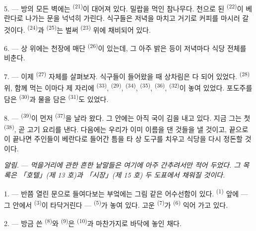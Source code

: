 \VUsaut{4.6mm}
\VUsaut{3.0mm}

5. --- 방의 모든 벽에는  \textsuperscript{(21)}이 대어져 있다. 밀랍을
먹인 참나무다. 천으로 된  \textsuperscript{(22)}이
베란다로 나가는 문을 넉넉히 가린다. 식구들은 저녁을 마치고 거기로 커피를 마시러 갈
것이다.  \textsuperscript{(24)}과  \textsuperscript{(25)}는
벌써  \textsuperscript{(23)} 위에 채비되어 있다.

6. --- 상 위에는 천장에 매단  \textsuperscript{(26)}이 있는데, 그 아주
밝은 등이 저녁마다 식당 전체를 비춘다.

7. --- 이제  \textsuperscript{(27)} 자체를 살펴보자. 식구들이 들어왔을 때
상차림은 다 되어 있었다.  \textsuperscript{(28)} 위, 함께 먹는 이마다 제
자리에  \textsuperscript{(33)},  \textsuperscript{(29)},
 \textsuperscript{(34)},  \textsuperscript{(35)},
 \textsuperscript{(36)},  \textsuperscript{(32)}이 놓여 있었다.
포도주를 담은  \textsuperscript{(30)}과 물을 담은 
\textsuperscript{(31)}도 있었다.

8. ---  \textsuperscript{(39)}이 먼저  \textsuperscript{(37)}을
날라 왔다. 그 안에는 아직 국이 김을 내고 있다. 지금 그는 첫 
\textsuperscript{(38)}, 곧 고기 요리를 낸다. 다음에는 우리가 이미 이름을 댄 것들을
낼 것이고, 끝으로 이 끝나면 주인들이 베란다로 들어간 틈을 타 상 도구를
치우고 식당을 다시 정돈할 것이다.

\textit{알림.} --- \textit{먹을거리에 관한 흔한 낱말들은 여기에 아주 간추려서만
적어 두었다. 그 목록은 「호텔」(제 13 호)과 「시장」(제 15 호) 두 도표에서 채워질
것이다.}

\VUsaut{4.6mm}
\VUsaut{3.0mm}

1. --- 반쯤 열린 문으로 들여다보는 부엌에는 그림 같은 어수선함이 있다. 
\textsuperscript{(1)} 앞에 — 그 안에서  \textsuperscript{(3)}이 타닥거린다 —
 \textsuperscript{(5)}가 놓여 있다. 고운 
\textsuperscript{(7)}가  \textsuperscript{(6)} 익어 가고 있다.

2. --- 방금 쓴  \textsuperscript{(8)}와  \textsuperscript{(9)}은
 \textsuperscript{(10)}과 마찬가지로 바닥에 놓인 채다.

